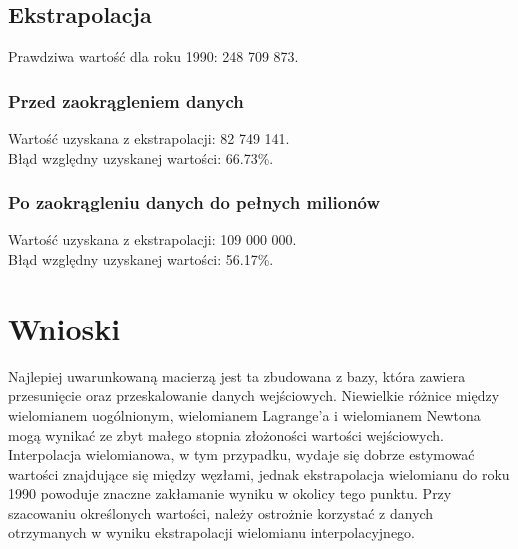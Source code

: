 \documentclass[11pt]{scrartcl}
\begin{document}
    \subsection{Ekstrapolacja}
    Prawdziwa wartość dla roku 1990: 248 709 873.

    \subsubsection*{Przed zaokrągleniem danych}
    Wartość uzyskana z ekstrapolacji: 82 749 141. \\
    Błąd względny uzyskanej wartości: 66.73\%.

    \subsubsection*{Po zaokrągleniu danych do pełnych milionów}
    Wartość uzyskana z ekstrapolacji: 109 000 000. \\
    Błąd względny uzyskanej wartości: 56.17\%.

    \section{Wnioski}
    Najlepiej uwarunkowaną macierzą jest ta zbudowana z bazy, która zawiera
    przesunięcie oraz przeskalowanie danych wejściowych. Niewielkie różnice między
    wielomianem uogólnionym, wielomianem Lagrange'a i wielomianem Newtona mogą
    wynikać ze zbyt małego stopnia złożoności wartości wejściowych. \\
    Interpolacja wielomianowa, w tym przypadku, wydaje się dobrze estymować wartości
    znajdujące się między węzłami, jednak ekstrapolacja wielomianu do roku 1990
    powoduje znaczne zakłamanie wyniku w okolicy tego punktu. Przy szacowaniu
    określonych wartości, należy ostrożnie korzystać z danych otrzymanych w wyniku ekstrapolacji wielomianu interpolacyjnego.
\end{document}
